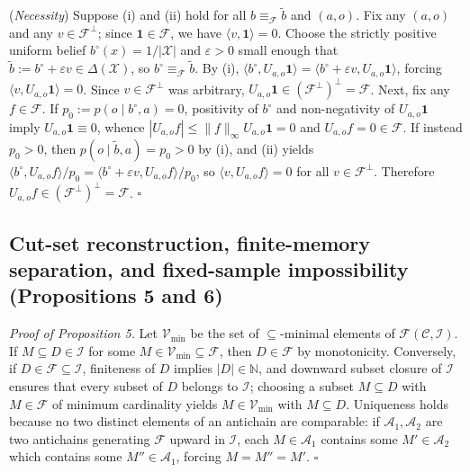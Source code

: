 \documentclass[11pt,a4paper]{article}
\begin{document}
(\emph{Necessity}) Suppose (i) and (ii) hold for all
\(b \equiv_{\mathcal{F}} \tilde{b}\) and \((a,o)\). Fix any \((a,o)\)
and any \(v \in \mathcal{F}^\perp\); since
\(\mathbf{1} \in \mathcal{F}\), we have
\(\langle v, \mathbf{1}\rangle = 0\). Choose the strictly positive
uniform belief \(b^\circ(x) = 1/|\mathcal{X}|\) and \(\varepsilon > 0\)
small enough that
\(\tilde{b} := b^\circ + \varepsilon v \in \Delta(\mathcal{X})\), so
\(b^\circ \equiv_{\mathcal{F}} \tilde{b}\). By (i),
\(\langle b^\circ, U_{a,o}\mathbf{1}\rangle = \langle b^\circ + \varepsilon v, U_{a,o}\mathbf{1}\rangle\),
forcing \(\langle v, U_{a,o}\mathbf{1}\rangle = 0\). Since
\(v \in \mathcal{F}^\perp\) was arbitrary,
\(U_{a,o}\mathbf{1} \in (\mathcal{F}^\perp)^\perp = \mathcal{F}\). Next,
fix any \(f \in \mathcal{F}\). If \(p_0 := p(o \mid b^\circ, a) = 0\),
positivity of \(b^\circ\) and non-negativity of \(U_{a,o}\mathbf{1}\)
imply \(U_{a,o}\mathbf{1} \equiv 0\), whence
\(|U_{a,o}f| \le \|f\|_\infty U_{a,o}\mathbf{1} = 0\) and
\(U_{a,o}f = 0 \in \mathcal{F}\). If instead \(p_0 > 0\), then
\(p(o \mid \tilde{b}, a) = p_0 > 0\) by (i), and (ii) yields
\(\langle b^\circ, U_{a,o}f\rangle / p_0 = \langle b^\circ + \varepsilon v, U_{a,o}f\rangle / p_0\),
so \(\langle v, U_{a,o}f\rangle = 0\) for all
\(v \in \mathcal{F}^\perp\). Therefore
\(U_{a,o}f \in (\mathcal{F}^\perp)^\perp = \mathcal{F}\). \(\square\)

\subsection{Cut-set reconstruction, finite-memory separation, and
fixed-sample impossibility (Propositions 5 and
6)}\label{cut-set-reconstruction-finite-memory-separation-and-fixed-sample-impossibility-propositions-5-and-6}

\emph{Proof of Proposition 5.} Let \(\mathcal{V}_{\min}\) be the set of
\(\subseteq\)-minimal elements of
\(\mathcal{F}(\mathcal{C}, \mathcal{I})\). If
\(M \subseteq D \in \mathcal{I}\) for some
\(M \in \mathcal{V}_{\min} \subseteq \mathcal{F}\), then
\(D \in \mathcal{F}\) by monotonicity. Conversely, if
\(D \in \mathcal{F} \subseteq \mathcal{I}\), finiteness of \(D\) implies
\(|D| \in \mathbb{N}\), and downward subset closure of \(\mathcal{I}\)
ensures that every subset of \(D\) belongs to \(\mathcal{I}\); choosing
a subset \(M \subseteq D\) with \(M \in \mathcal{F}\) of minimum
cardinality yields \(M \in \mathcal{V}_{\min}\) with \(M \subseteq D\).
Uniqueness holds because no two distinct elements of an antichain are
comparable: if \(\mathcal{A}_1, \mathcal{A}_2\) are two antichains
generating \(\mathcal{F}\) upward in \(\mathcal{I}\), each
\(M \in \mathcal{A}_1\) contains some \(M' \in \mathcal{A}_2\) which
contains some \(M'' \in \mathcal{A}_1\), forcing \(M = M'' = M'\).
\(\square\)
\end{document}

